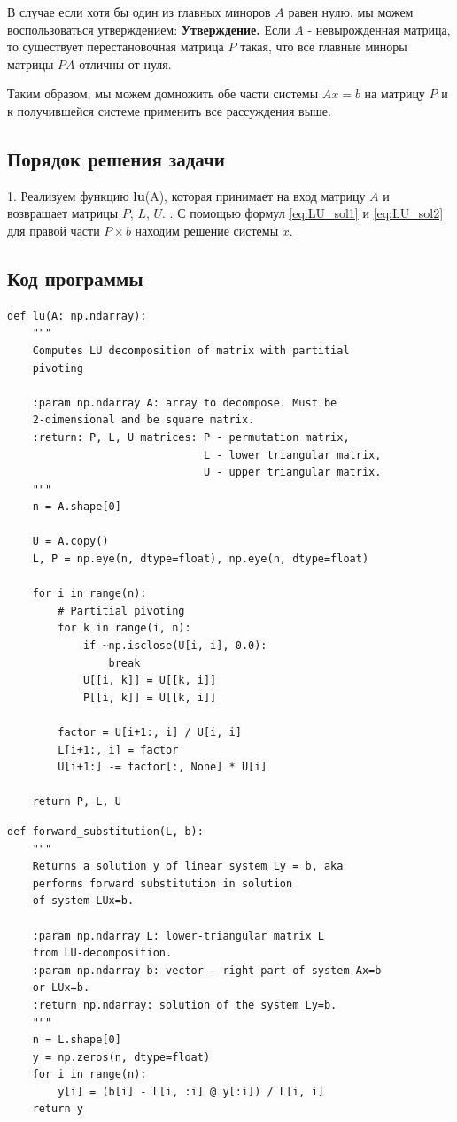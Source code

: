 \documentclass[12pt]{article}%
\begin{document}
В случае если хотя бы один из главных миноров $A$ равен нулю, мы можем воспользоваться утверждением:
\newline
\textbf{Утверждение.} Если $A$ - невырожденная матрица, то существует перестановочная матрица $P$ такая, что все главные миноры матрицы $PA$ отличны от нуля.

Таким образом, мы можем домножить обе части системы $Ax=b$ на матрицу $P$ и к получившейся системе применить все рассуждения выше.



\subsection{Порядок решения задачи}
1. Реализуем функцию \textbf{lu}(A), которая принимает на вход матрицу $A$ и возвращает матрицы $P$, $L$, $U$.
. С помощью формул \ref{eq:LU_sol1} и \ref{eq:LU_sol2} для правой части $P \times b$ находим решение системы $x$.



\subsection{Код программы}
\begin{verbatim}
def lu(A: np.ndarray):
    """
    Computes LU decomposition of matrix with partitial 
    pivoting

    :param np.ndarray A: array to decompose. Must be 
    2-dimensional and be square matrix.
    :return: P, L, U matrices: P - permutation matrix, 
                               L - lower triangular matrix, 
                               U - upper triangular matrix.
    """
    n = A.shape[0]

    U = A.copy()
    L, P = np.eye(n, dtype=float), np.eye(n, dtype=float)

    for i in range(n):
        # Partitial pivoting
        for k in range(i, n):
            if ~np.isclose(U[i, i], 0.0):
                break
            U[[i, k]] = U[[k, i]]
            P[[i, k]] = U[[k, i]]
        
        factor = U[i+1:, i] / U[i, i]
        L[i+1:, i] = factor
        U[i+1:] -= factor[:, None] * U[i]
    
    return P, L, U
\end{verbatim}


\begin{verbatim}
def forward_substitution(L, b):
    """
    Returns a solution y of linear system Ly = b, aka
    performs forward substitution in solution 
    of system LUx=b.

    :param np.ndarray L: lower-triangular matrix L 
    from LU-decomposition.
    :param np.ndarray b: vector - right part of system Ax=b 
    or LUx=b.
    :return np.ndarray: solution of the system Ly=b. 
    """
    n = L.shape[0]
    y = np.zeros(n, dtype=float)
    for i in range(n):
        y[i] = (b[i] - L[i, :i] @ y[:i]) / L[i, i]
    return y
\end{verbatim}
\end{document}
